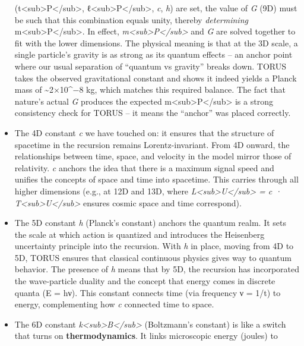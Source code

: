 \begin{itemize}
  (t\textless{}sub\textgreater{}P\textless{}/sub\textgreater{},
  ℓ\textless{}sub\textgreater{}P\textless{}/sub\textgreater{}, \emph{c},
  \emph{h}) are set, the value of \emph{G} (9D) must be such that this
  combination equals unity​, thereby \emph{determining}
  m\textless{}sub\textgreater{}P\textless{}/sub\textgreater{}. In
  effect,
  \emph{m\textless{}sub\textgreater{}P\textless{}/sub\textgreater{}} and
  \emph{G} are solved together to fit with the lower dimensions. The
  physical meaning is that at the 3D scale, a single particle's gravity
  is as strong as its quantum effects -- an anchor point where our usual
  separation of ``quantum vs gravity'' breaks down. TORUS takes the
  observed gravitational constant and shows it indeed yields a Planck
  mass of \textasciitilde{}2×10\^{}−8 kg, which matches this required
  balance. The fact that nature's actual \emph{G} produces the expected
  m\textless{}sub\textgreater{}P\textless{}/sub\textgreater{} is a
  strong consistency check for TORUS​ -- it means the ``anchor'' was
  placed correctly.
\item
  The 4D constant \emph{c} we have touched on: it ensures that the
  structure of spacetime in the recursion remains Lorentz-invariant.
  From 4D onward, the relationships between time, space, and velocity in
  the model mirror those of relativity. \emph{c} anchors the idea that
  there is a maximum signal speed and unifies the concepts of space and
  time into spacetime. This carries through all higher dimensions (e.g.,
  at 12D and 13D, where
  \emph{L\textless{}sub\textgreater{}U\textless{}/sub\textgreater{} = c
  · T\textless{}sub\textgreater{}U\textless{}/sub\textgreater{}} ensures
  cosmic space and time correspond​).
\item
  The 5D constant \emph{h} (Planck's constant) anchors the quantum
  realm. It sets the scale at which action is quantized and introduces
  the Heisenberg uncertainty principle into the recursion. With \emph{h}
  in place, moving from 4D to 5D, TORUS ensures that classical
  continuous physics gives way to quantum behavior. The presence of
  \emph{h} means that by 5D, the recursion has incorporated the
  wave-particle duality and the concept that energy comes in discrete
  quanta (E = hν). This constant connects time (via frequency ν = 1/t)
  to energy, complementing how \emph{c} connected time to space.
\item
  The 6D constant
  \emph{k\textless{}sub\textgreater{}B\textless{}/sub\textgreater{}}
  (Boltzmann's constant) is like a switch that turns on
  \textbf{thermodynamics}. It links microscopic energy (joules) to

\end{itemize}
